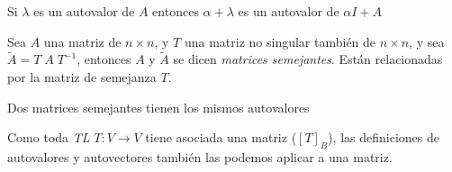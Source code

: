 \begin{teorema}
    Si $\lambda$ es un autovalor de $A$ entonces $\alpha + \lambda$ es 
    un autovalor de $\alpha I + A$
\end{teorema}

\begin{definition}
    Sea $A$ una matriz de $n \times n$, y $T$ una matriz no singular también
    de $n \times n$, y sea $\tilde{A} = T \; A \; T^{-1} $, entonces $A$ y $\tilde{A}$
    se dicen \textit{matrices semejantes}. Están relacionadas por la matriz de 
    semejanza $T$.
\end{definition}

\begin{teorema}
    Dos matrices semejantes tienen los mismos autovalores
\end{teorema}

\begin{obs}
    Como toda \textit{TL} $T:V\rightarrow V$ tiene asociada una matriz ($[T]_B$),
    las definiciones de autovalores y autovectores también las podemos aplicar a una matriz.
\end{obs}
\vspace*{1pt}

